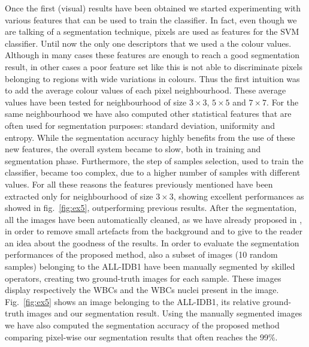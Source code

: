 \documentclass[final,a4paper,12pt,english]{UnicaPhdThesis3}
\begin{document}
	Once the first (visual) results have been obtained we started experimenting with various features that can be used to train the classifier.
	In fact, even though we are talking of a segmentation technique, pixels are used as features for the SVM classifier. Until now the only one descriptors that we used a the colour values. Although in many cases these features are enough to reach a good segmentation result, in other cases a poor feature set like this is not able to discriminate pixels belonging to regions with wide variations in colours. Thus the first intuition was to add the average colour values of each pixel neighbourhood. These average values have been tested for neighbourhood of size $3 \times 3$, $5 \times 5$ and $7 \times 7$. For the same neighbourhood we have also computed other statistical features that are often used for segmentation purposes: standard deviation, uniformity and entropy. While the segmentation accuracy highly benefits from the use of these new features, the overall system became to slow, both in training and segmentation phase. Furthermore, the step of samples selection, used to train the classifier, became too complex, due to a higher number of samples with different values. For all these reasons the features previously mentioned have been extracted only for neighbourhood of size $3 \times 3$, showing excellent performances as showed in fig.~\ref{fig:ex5}, outperforming previous results. After the segmentation, all the images have been automatically cleaned, as we have already proposed in \cite{putzu,putzu2}, in order to remove small artefacts from the background and to give to the reader an idea about the goodness of the results. In order to evaluate the segmentation performances of the proposed method, also a subset of images (10 random samples) belonging to the ALL-IDB1 have been manually segmented by skilled operators, creating two ground-truth images for each sample. These images display respectively the WBCs and the WBCs nuclei present in the image. Fig.~\ref{fig:ex5} shows an image belonging to the ALL-IDB1, its relative ground-truth images and our segmentation result. Using the manually segmented images we have also computed the segmentation accuracy of the proposed method comparing pixel-wise our segmentation results that often reaches the 99\%.
	
\end{document}
